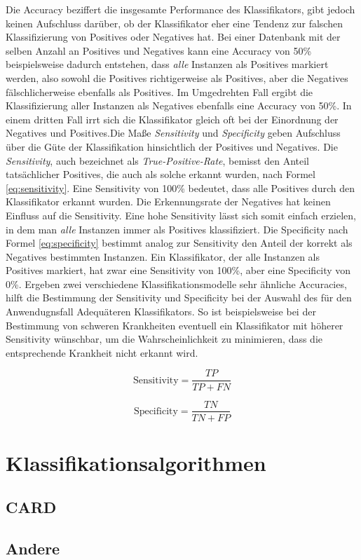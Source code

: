 Die Accuracy beziffert die insgesamte Performance des Klassifikators, gibt jedoch keinen Aufschluss darüber, ob der Klassifikator eher eine Tendenz zur falschen Klassifizierung von Positives oder Negatives hat. Bei einer Datenbank mit der selben Anzahl an Positives und Negatives kann eine Accuracy von 50\% beispielsweise dadurch entstehen, dass \emph{alle} Instanzen als Positives markiert werden, also sowohl die Positives richtigerweise als Positives, aber die Negatives fälschlicherweise ebenfalls als Positives. Im Umgedrehten Fall ergibt die Klassifizierung aller Instanzen als Negatives ebenfalls eine Accuracy von 50\%. In einem dritten Fall irrt sich die Klassifikator gleich oft bei der Einordnung der Negatives und Positives.Die Maße \emph{Sensitivity} und \emph{Specificity} geben Aufschluss über die Güte der Klassifikation hinsichtlich der Positives und Negatives. Die \emph{Sensitivity}, auch bezeichnet als \emph{True-Positive-Rate}, bemisst den Anteil tatsächlicher Positives, die auch als solche erkannt wurden, nach Formel \ref{eq:sensitivity}. Eine Sensitivity von 100\% bedeutet, dass alle Positives durch den Klassifikator erkannt wurden. Die Erkennungsrate der Negatives hat keinen Einfluss auf die Sensitivity. Eine hohe Sensitivity lässt sich somit \glqq einfach\grqq{} erzielen, in dem man \emph{alle} Instanzen immer als Positives klassifiziert. Die Specificity nach Formel \ref{eq:specificity} bestimmt analog zur Sensitivity den Anteil der korrekt als Negatives bestimmten Instanzen. Ein Klassifikator, der alle Instanzen als Positives markiert, hat zwar eine Sensitivity von 100\%, aber eine Specificity von 0\%. Ergeben zwei verschiedene Klassifikationsmodelle sehr ähnliche Accuracies, hilft die Bestimmung der Sensitivity und Specificity bei der Auswahl des für den Anwendugnsfall Adequäteren Klassifikators. So ist beispielsweise bei der Bestimmung von schweren Krankheiten eventuell ein Klassifikator mit höherer Sensitivity wünschbar, um die Wahrscheinlichkeit zu minimieren, dass die entsprechende Krankheit nicht erkannt wird. \cite{sens-and_spec} \cite{accuracy}

\begin{equation}
\text{Sensitivity} = \frac{TP}{TP+FN}
\label{eq:sensitivity}
\end{equation}

\begin{equation}
\text{Specificity} = \frac{TN}{TN+FP}
\label{eq:specificity}
\end{equation}
\section{Klassifikationsalgorithmen}
\subsection{CARD}
\subsection{Andere}